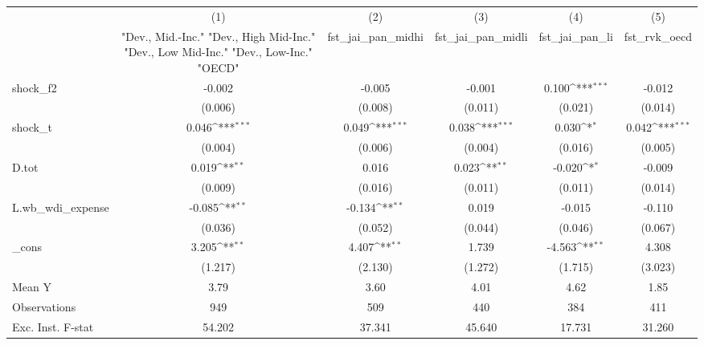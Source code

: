 {
\def\sym#1{\ifmmode^{#1}\else\(^{#1}\)\fi}
\begin{tabular}{l*{5}{c}}
\toprule
            &\multicolumn{1}{c}{(1)}&\multicolumn{1}{c}{(2)}&\multicolumn{1}{c}{(3)}&\multicolumn{1}{c}{(4)}&\multicolumn{1}{c}{(5)}\\
            &\multicolumn{1}{c}{ "Dev., Mid.-Inc." "Dev., High Mid-Inc." "Dev., Low Mid-Inc." "Dev., Low-Inc." "OECD" }&\multicolumn{1}{c}{fst\_jai\_pan\_midhi}&\multicolumn{1}{c}{fst\_jai\_pan\_midli}&\multicolumn{1}{c}{fst\_jai\_pan\_li}&\multicolumn{1}{c}{fst\_rvk\_oecd}\\
\midrule
shock\_f2    &      -0.002         &      -0.005         &      -0.001         &       0.100\sym{***}&      -0.012         \\
            &     (0.006)         &     (0.008)         &     (0.011)         &     (0.021)         &     (0.014)         \\
\addlinespace
shock\_t     &       0.046\sym{***}&       0.049\sym{***}&       0.038\sym{***}&       0.030\sym{*}  &       0.042\sym{***}\\
            &     (0.004)         &     (0.006)         &     (0.004)         &     (0.016)         &     (0.005)         \\
\addlinespace
D.tot       &       0.019\sym{**} &       0.016         &       0.023\sym{**} &      -0.020\sym{*}  &      -0.009         \\
            &     (0.009)         &     (0.016)         &     (0.011)         &     (0.011)         &     (0.014)         \\
\addlinespace
L.wb\_wdi\_expense&      -0.085\sym{**} &      -0.134\sym{**} &       0.019         &      -0.015         &      -0.110         \\
            &     (0.036)         &     (0.052)         &     (0.044)         &     (0.046)         &     (0.067)         \\
\addlinespace
\_cons      &       3.205\sym{**} &       4.407\sym{**} &       1.739         &      -4.563\sym{**} &       4.308         \\
            &     (1.217)         &     (2.130)         &     (1.272)         &     (1.715)         &     (3.023)         \\
\midrule
Mean Y      &        3.79         &        3.60         &        4.01         &        4.62         &        1.85         \\
Observations&         949         &         509         &         440         &         384         &         411         \\
Exc. Inst. F-stat&      54.202         &      37.341         &      45.640         &      17.731         &      31.260         \\
\bottomrule
\end{tabular}
}
